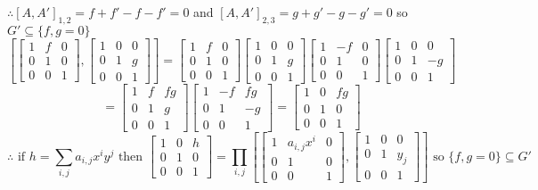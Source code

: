 \documentclass{article}
\begin{document}
\begin{siderules}
\(\therefore [A,A']_{1,2}=f+f'-f-f'=0\) and \([A,A']_{2,3}=g+g'-g-g'=0\) so \(G'\subseteq\{f,g=0\}\)
\[\left[\begin{bmatrix}1&f&0\\0&1&0\\0&0&1\end{bmatrix},\begin{bmatrix}1&0&0\\0&1&g\\0&0&1\end{bmatrix}\right]=\begin{bmatrix}1&f&0\\0&1&0\\0&0&1\end{bmatrix}\begin{bmatrix}1&0&0\\0&1&g\\0&0&1\end{bmatrix}\begin{bmatrix}1&-f&0\\0&1&0\\0&0&1\end{bmatrix}\begin{bmatrix}1&0&0\\0&1&-g\\0&0&1\end{bmatrix}\]
\[=\begin{bmatrix}1&f&fg\\0&1&g\\0&0&1\end{bmatrix}\begin{bmatrix}1&-f&fg\\0&1&-g\\0&0&1\end{bmatrix}=\begin{bmatrix}1&0&fg\\0&1&0\\0&0&1\end{bmatrix}\]
\[\therefore\text{ if }h=\sum_{i,j}a_{i,j}x^{i}y^{j}\text{ then }\begin{bmatrix}1&0&h\\0&1&0\\0&0&1\end{bmatrix}=\prod_{i,j}\left[\begin{bmatrix}1&a_{i,j}x^{i}&0\\0&1&0\\0&0&1\end{bmatrix},\begin{bmatrix}1&0&0\\0&1&y_{j}\\0&0&1\end{bmatrix}\right]\text{ so }\{f,g=0\}\subseteq G'\]

\end{siderules}
\end{document}
